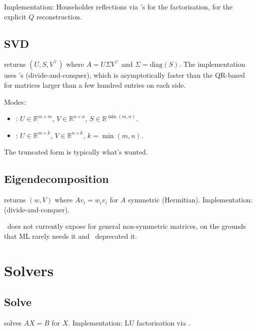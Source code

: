 Implementation: Householder reflections via \Accelerate's
 for the factorisation,  for the
explicit $Q$ reconstruction.

\subsection{SVD}
\label{ssec:linalg:svd}

 returns $(U, S, V^\top)$ where $A = U \Sigma V^\top$
and $\Sigma = \text{diag}(S)$. The implementation uses
\Accelerate's  (divide-and-conquer), which is
asymptotically faster than the QR-based  for
matrices larger than a few hundred entries on each side.

Modes:
\begin{itemize}
  \item {}: $U \in \mathbb{R}^{m \times
    m}$, $V \in \mathbb{R}^{n \times n}$, $S \in \mathbb{R}^{\min(m,
    n)}$.
  \item {}: $U \in \mathbb{R}^{m \times
    k}$, $V \in \mathbb{R}^{n \times k}$, $k = \min(m, n)$.
\end{itemize}

The truncated form is typically what's wanted.

\subsection{Eigendecomposition}
\label{ssec:linalg:eigh}

 returns $(w, V)$ where $A v_i = w_i v_i$ for $A$
symmetric (Hermitian). Implementation: 
(divide-and-conquer).

\Lucid\ does not currently expose  for general
non-symmetric matrices, on the grounds that ML rarely needs it
and \ deprecated it.

\section{Solvers}
\label{sec:linalg:solvers}

\subsection{Solve}
\label{ssec:linalg:solve}

 solves $AX = B$ for $X$. Implementation: LU
factorisation via .

